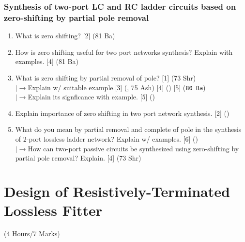 \documentclass[12pt]{article}
\newcommand{\lb}{\\$\left|\rightarrow\right.$}
\begin{document}
		\subsubsection{Synthesis of two-port LC and RC ladder circuits based on zero-shifting by partial pole removal}
			\begin{enumerate}
				\item What is zero shifting? \hfill [2] (81 Ba)
				
				\item How is zero shifting useful for two port networks synthesis? Explain with examples. \hfill [4] (81 Ba)
				
				\item What is zero shifting by partial removal of pole? \hfill [1] (73 Shr)
				\lb Explain w/ suitable example.\hfill [3] (, 75 Ash) [4] () [5] (\texttt{80 Ba})
				\lb Explain its signficance with example. \hfill [5] ()
				
				\item Explain importance of zero shifting in two port network synthesis. \hfill [2] ()

				\item What do you mean by partial removal and complete of pole in the synthesis of 2-port lossless ladder network? Explain w/ examples. \hfill [6] ()
				\lb How can two-port passive circuits be synthesized using zero-shifting by partial pole removal? Explain. \hfill [4] (73 Shr)
			\end{enumerate}

	\pagebreak
\section{Design of Resistively-Terminated Lossless Fitter}
	\begin{center}(4 Hours/7 Marks)\end{center}
\end{document}
